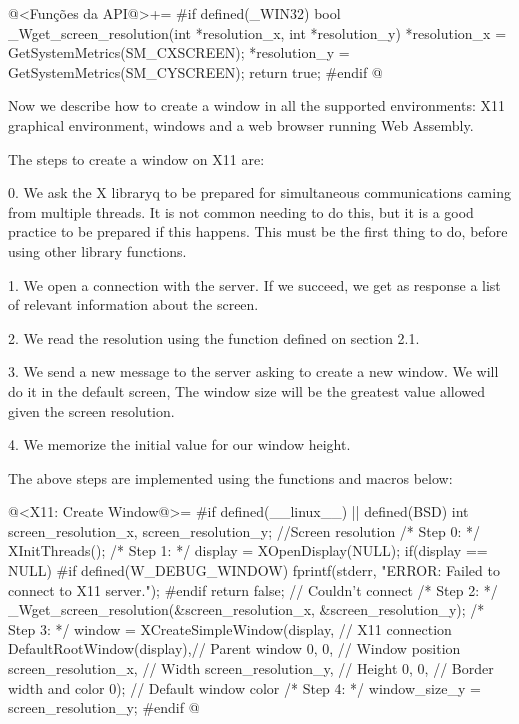 \iniciocodigo
@<Funções da API@>+=
#if defined(_WIN32)
bool _Wget_screen_resolution(int *resolution_x, int *resolution_y){
  *resolution_x = GetSystemMetrics(SM_CXSCREEN);
  *resolution_y = GetSystemMetrics(SM_CYSCREEN);
  return true;
}
#endif
@
\fimcodigo


Now we describe how to create a window in all the supported
environments: X11 graphical environment, windows and a web browser
running Web Assembly.


The steps to create a window on X11 are:

0. We ask the X libraryq to be prepared for simultaneous
communications caming from multiple threads. It is not common needing
to do this, but it is a good practice to be prepared if this
happens. This must be the first thing to do, before using other
library functions.

1. We open a connection with the server. If we succeed, we get as
response a list of relevant information about the screen.

2. We read the resolution using the function defined on section 2.1.

3. We send a new message to the server asking to create a new
window. We will do it in the default screen, The window size will be
the greatest value allowed given the screen resolution.

4. We memorize the initial value for our window height.

The above steps are implemented using the functions and macros below:

\iniciocodigo
@<X11: Create Window@>=
#if defined(__linux__) || defined(BSD)
int screen_resolution_x, screen_resolution_y; //Screen resolution
/* Step 0: */
XInitThreads();
/* Step 1: */
display = XOpenDisplay(NULL);
if(display == NULL){
#if defined(W_DEBUG_WINDOW)
  fprintf(stderr, "ERROR: Failed to connect to X11 server.\n");
#endif
  return false; // Couldn't connect
}
/* Step 2: */
_Wget_screen_resolution(&screen_resolution_x, &screen_resolution_y);
/* Step 3: */
window = XCreateSimpleWindow(display, // X11 connection
                             DefaultRootWindow(display),// Parent window
                             0, 0, // Window position
                             screen_resolution_x, // Width
                             screen_resolution_y, // Height
                             0, 0, // Border width and color
                             0); // Default window color
/* Step 4: */
window_size_y = screen_resolution_y;
#endif
@
\fimcodigo

